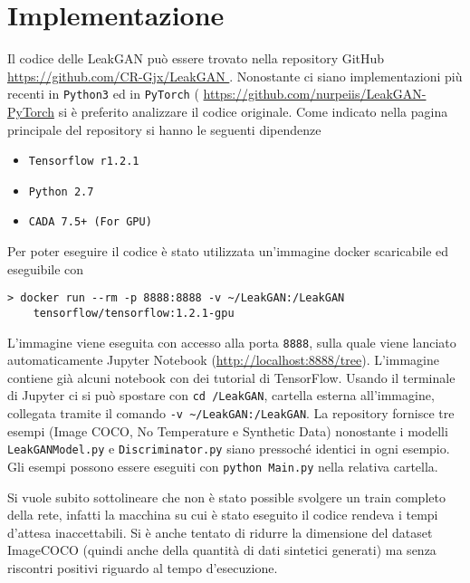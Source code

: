 
\section{Implementazione}
Il codice delle LeakGAN può essere trovato nella repository GitHub
\url{ https://github.com/CR-Gjx/LeakGAN }.
Nonostante ci siano implementazioni più recenti in {\tt Python3} ed in {\tt PyTorch} (
\url{https://github.com/nurpeiis/LeakGAN-PyTorch}
si è preferito analizzare il codice originale.
Come indicato nella pagina principale del repository si hanno le seguenti dipendenze
\begin{itemize}
  \item {\tt Tensorflow r1.2.1}
  \item {\tt Python 2.7}
  \item {\tt CADA 7.5+ (For GPU)}
\end{itemize}
Per poter eseguire il codice è stato utilizzata un'immagine docker scaricabile ed eseguibile con
\begin{lstlisting}
> docker run --rm -p 8888:8888 -v ~/LeakGAN:/LeakGAN
    tensorflow/tensorflow:1.2.1-gpu
\end{lstlisting}
L'immagine viene eseguita con accesso alla porta {\tt 8888}, sulla quale viene lanciato automaticamente Jupyter Notebook (\url{http://localhost:8888/tree}).
L'immagine contiene già alcuni notebook con dei tutorial di TensorFlow.
Usando il terminale di Jupyter ci si può spostare con \lstinline{cd /LeakGAN}, cartella esterna all'immagine, collegata tramite il comando \lstinline{-v ~/LeakGAN:/LeakGAN}.
La repository fornisce tre esempi (Image COCO, No Temperature e Synthetic Data) nonostante i modelli \lstinline{LeakGANModel.py} e \lstinline{Discriminator.py} siano pressoché identici in ogni esempio.
Gli esempi possono essere eseguiti con \lstinline{python Main.py} nella relativa cartella.

Si vuole subito sottolineare che non è stato possible svolgere un train completo della rete, infatti la macchina su cui è stato eseguito il codice rendeva i tempi d'attesa inaccettabili.
Si è anche tentato di ridurre la dimensione del dataset ImageCOCO (quindi anche della quantità di dati sintetici generati) ma senza riscontri positivi riguardo al tempo d'esecuzione.



